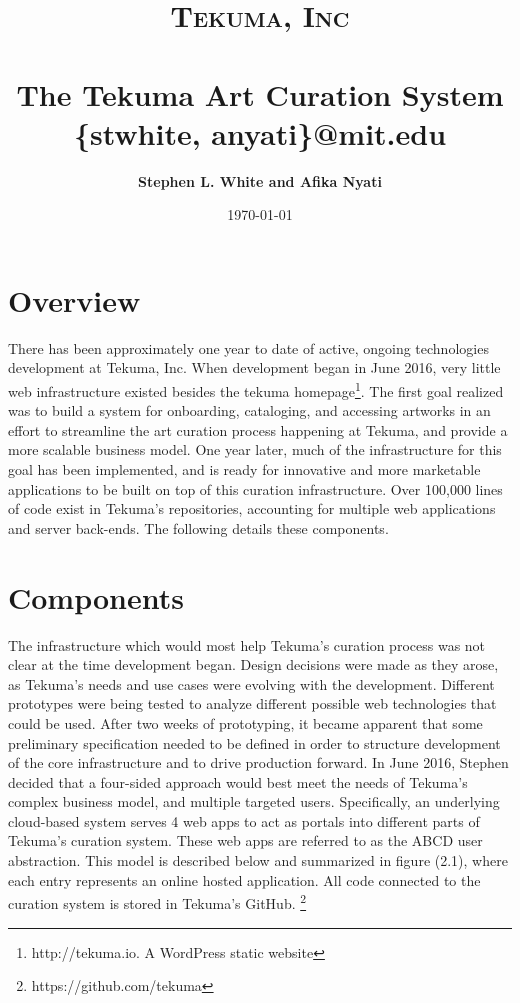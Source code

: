 \documentclass[fontsize=12pt]{scrartcl} %
\title{
\normalfont \normalsize
\textsc{Tekuma, Inc} \\[6pt]
\horrule{0.2pt} \\[10pt] %
\Huge The Tekuma Art Curation System  %
\horrule{1.5pt}  %
\normalsize \{stwhite, anyati\}@mit.edu
}
\author{\textbf{Stephen L. White and Afika Nyati}}
\date{\normalsize \today} %
\numberwithin{equation}{section} %
\numberwithin{figure}{section} %
\numberwithin{table}{section} %
\begin{document}
\maketitle %

\section{Overview}
There has been approximately one year to date of active, ongoing technologies development at Tekuma, Inc. When development began in June 2016, very little web infrastructure existed besides the tekuma homepage\footnote{http://tekuma.io. A WordPress static website}. The first goal realized was to build a system for onboarding, cataloging, and accessing artworks in an effort to streamline the art curation process happening at Tekuma, and provide a more scalable business model. One year later, much of the infrastructure for this goal has been implemented, and is ready for innovative and more marketable applications to be built on top of this curation infrastructure. Over 100,000 lines of code exist in Tekuma's repositories, accounting for multiple web applications and server back-ends. The following details these components.

\section{Components}
The infrastructure which would most help Tekuma’s curation process was not clear at the time development began. Design decisions were made as they arose, as Tekuma's needs and use cases were evolving with the development. Different prototypes were being tested to analyze different possible web technologies that could be used. After two weeks of prototyping, it became apparent that some preliminary specification needed to be defined in order to structure development of the core infrastructure and to drive production forward. In June 2016, Stephen decided that a four-sided approach would best meet the needs of Tekuma’s complex business model, and multiple targeted users. Specifically, an underlying cloud-based system serves 4 web apps to act as portals into different parts of Tekuma's curation system. These web apps are referred to as the ABCD user abstraction. This model is described below and summarized in figure (2.1), where each entry represents an online hosted application. All code connected to the curation system is stored in Tekuma's GitHub. \footnote{https://github.com/tekuma}
\end{document}
